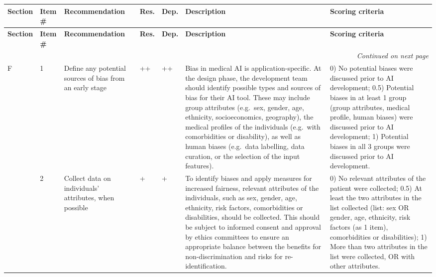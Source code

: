 \begin{landscape}
\fontsize{6.5pt}{7.8pt}\selectfont
\setlength{\tabcolsep}{3pt}
\begin{longtable}{@{}p{0.9cm}p{0.5cm}p{2.8cm}p{0.6cm}p{0.6cm}p{7.2cm}p{5.5cm}@{}}
	\toprule
	\textbf{Section} & \textbf{Item \#} & \textbf{Recommendation} & \textbf{Res.} & \textbf{Dep.} & \textbf{Description} & \textbf{Scoring criteria} \\
	\midrule
	\endfirsthead
	\toprule
	\textbf{Section} & \textbf{Item \#} & \textbf{Recommendation} & \textbf{Res.} & \textbf{Dep.} & \textbf{Description} & \textbf{Scoring criteria} \\
	\midrule
	\endhead
	\midrule
	\multicolumn{7}{r}{\emph{Continued on next page}}\\
	\endfoot
	\bottomrule
	\endlastfoot
	F & 1 & Define any potential sources of bias from an early stage & ++ & ++ & Bias in medical AI is application-specific. At the design phase, the development team should identify possible types and sources of bias for their AI tool. These may include group attributes (e.g.\ sex, gender, age, ethnicity, socioeconomics, geography), the medical profiles of the individuals (e.g.\ with comorbidities or disability), as well as human biases (e.g.\ data labelling, data curation, or the selection of the input features). & 0) No potential biases were discussed prior to AI development; 0.5) Potential biases in at least 1 group (group attributes, medical profile, human biases) were discussed prior to AI development; 1) Potential biases in all 3 groups were discussed prior to AI development. \\
	\addlinespace
	& 2 & Collect data on individuals' attributes, when possible & + & + & To identify biases and apply measures for increased fairness, relevant attributes of the individuals, such as sex, gender, age, ethnicity, risk factors, comorbidities or disabilities, should be collected. This should be subject to informed consent and approval by ethics committees to ensure an appropriate balance between the benefits for non-discrimination and risks for re-identification. & 0) No relevant attributes of the patient were collected; 0.5) At least the two attributes in the list collected (list: sex OR gender, age, ethnicity, risk factors (as 1 item), comorbidities or disabilities); 1) More than two attributes in the list were collected, OR with other attributes. \\

\end{longtable}
\end{landscape}
